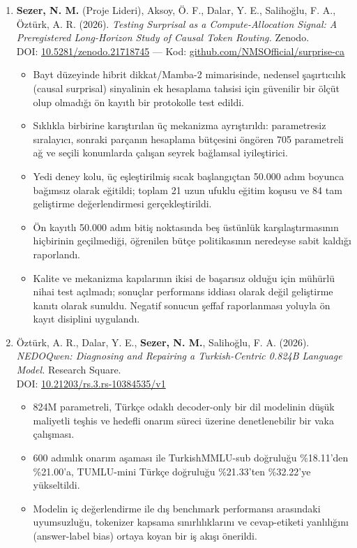 \documentclass[11pt,a4paper]{article}
\begin{document}
\begin{enumerate}[leftmargin=*, itemsep=0.35em, topsep=2pt, start=4]
    \item \textbf{Sezer, N. M.} (Proje Lideri), Aksoy, Ö. F., Dalar, Y. E., Salihoğlu, F. A., Öztürk, A. R. (2026). \textit{Testing Surprisal as a Compute-Allocation Signal: A Preregistered Long-Horizon Study of Causal Token Routing.} Zenodo. \\
    DOI: \href{https://doi.org/10.5281/zenodo.21718745}{10.5281/zenodo.21718745} --- Kod: \href{https://github.com/NMSOfficial/surprise-ca}{github.com/NMSOfficial/surprise-ca}
    \begin{itemize}
        \item Bayt düzeyinde hibrit dikkat/Mamba-2 mimarisinde, nedensel şaşırtıcılık (causal surprisal) sinyalinin ek hesaplama tahsisi için güvenilir bir ölçüt olup olmadığı ön kayıtlı bir protokolle test edildi.
        \item Sıklıkla birbirine karıştırılan üç mekanizma ayrıştırıldı: parametresiz sıralayıcı, sonraki parçanın hesaplama bütçesini öngören 705 parametreli ağ ve seçili konumlarda çalışan seyrek bağlamsal iyileştirici.
        \item Yedi deney kolu, üç eşleştirilmiş sıcak başlangıçtan 50.000 adım boyunca bağımsız olarak eğitildi; toplam 21 uzun ufuklu eğitim koşusu ve 84 tam geliştirme değerlendirmesi gerçekleştirildi.
        \item Ön kayıtlı 50.000 adım bitiş noktasında beş üstünlük karşılaştırmasının hiçbirinin geçilmediği, öğrenilen bütçe politikasının neredeyse sabit kaldığı raporlandı.
        \item Kalite ve mekanizma kapılarının ikisi de başarısız olduğu için mühürlü nihai test açılmadı; sonuçlar performans iddiası olarak değil geliştirme kanıtı olarak sunuldu. Negatif sonucun şeffaf raporlanması yoluyla ön kayıt disiplini uygulandı.
    \end{itemize}

    \item Öztürk, A. R., Dalar, Y. E., \textbf{Sezer, N. M.}, Salihoğlu, F. A. (2026). \textit{NEDOQwen: Diagnosing and Repairing a Turkish-Centric 0.824B Language Model.} Research Square. \\
    DOI: \href{https://doi.org/10.21203/rs.3.rs-10384535/v1}{10.21203/rs.3.rs-10384535/v1}
    \begin{itemize}
        \item 824M parametreli, Türkçe odaklı decoder-only bir dil modelinin düşük maliyetli teşhis ve hedefli onarım süreci üzerine denetlenebilir bir vaka çalışması.
        \item 600 adımlık onarım aşaması ile TurkishMMLU-sub doğruluğu \%18.11'den \%21.00'a, TUMLU-mini Türkçe doğruluğu \%21.33'ten \%32.22'ye yükseltildi.
        \item Modelin iç değerlendirme ile dış benchmark performansı arasındaki uyumsuzluğu, tokenizer kapsama sınırlılıklarını ve cevap-etiketi yanlılığını (answer-label bias) ortaya koyan bir iş akışı önerildi.
    \end{itemize}


\end{enumerate}
\end{document}
